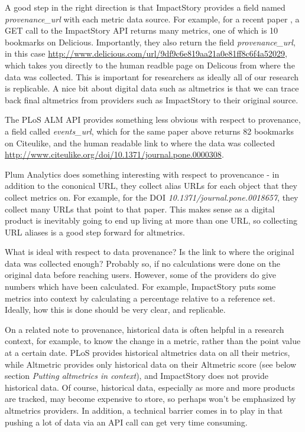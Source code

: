 \documentclass[letterpaper,superscriptaddress,showkeys,longbibliography]{revtex4-1}\usepackage{graphicx, color}
\begin{document}
A good step in the right direction is that ImpactStory provides a field named \emph{provenance\_url} with each metric data source. For example, for a recent paper \cite{piwowar2007}, a GET call to the ImpactStory API returns many metrics, one of which is 10 bookmarks on Delicious. Importantly, they also return the field \emph{provenance\_url}, in this case \url{http://www.delicious.com/url/9df9c6e819aa21a0e81ff8c6f4a52029}, which takes you directly to the human readble page on Delicous from where the data was collected. This is important for researchers as ideally all of our research is replicable. A nice bit about digital data such as altmetrics is that we can trace back final altmetrics from providers such as ImpactStory to their original source.

The PLoS ALM API provides something less obvious with respect to provenance, a field called \emph{events\_url}, which for the same paper above \cite{piwowar2007} returns 82 bookmarks on Citeulike, and the human readable link to where the data was collected \url{http://www.citeulike.org/doi/10.1371/journal.pone.0000308}. 

Plum Analytics does something interesting with respect to provencance - in addition to the cononical URL, they collect alias URLs for each object that they collect metrics on. For example, for the DOI \emph{10.1371/journal.pone.0018657}, they collect many URLs that point to that paper. This makes sense as a digital product is inevitably going to end up living at more than one URL, so collecting URL aliases is a good step forward for altmetrics. 

What is ideal with respect to data provenance? Is the link to where the original data was collected enough? Probably so, if no calculations were done on the original data before reaching users. However, some of the providers do give numbers which have been calculated. For example, ImpactStory puts some metrics into context by calculating a percentage relative to a reference set. Ideally, how this is done should be very clear, and replicable. 

On a related note to provenance, historical data is often helpful in a research context, for example, to know the change in a metric, rather than the point value at a certain date. PLoS provides historical altmetrics data on all their metrics, while Altmetric provides only historical data on their Altmetric score (see below section \emph{Putting altmetrics in context}), and ImpactStory does not provide historical data. Of course, historical data, especially as more and more products are tracked, may become expensive to store, so perhaps won't be emphasized by altmetrics providers. In addition, a technical barrier comes in to play in that pushing a lot of data via an API call can get very time consuming. 
\end{document}
